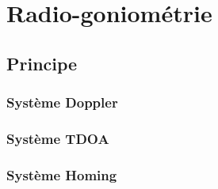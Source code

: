 \chapter{Radio-goniométrie}

\section{Principe}

\subsection{Système Doppler}

\subsection{Système TDOA}

\subsection{Système Homing}








